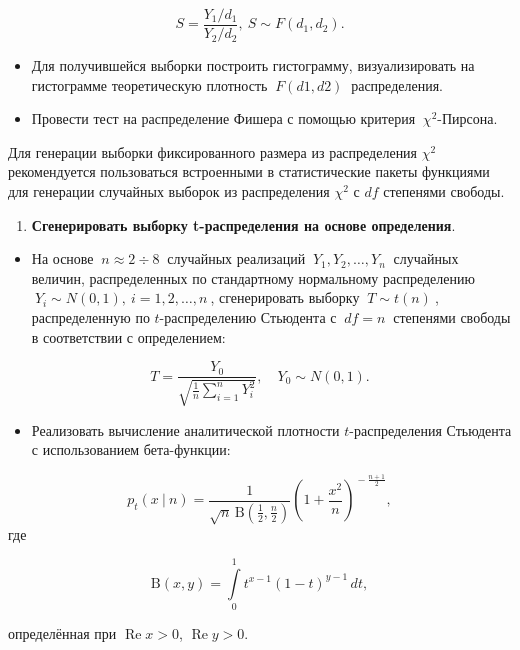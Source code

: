 \documentclass[
]{article}
\providecommand{\tightlist}{%
  \setlength{\itemsep}{0pt}\setlength{\parskip}{0pt}}
\begin{document}
\[
S = \frac{Y_1 / d_1}{Y_2 / d_2}, \ S\sim F(d_1, d_2).
\]

\begin{itemize}
\item
  Для получившейся выборки построить гистограмму, визуализировать на
  гистограмме теоретическую плотность \(\ F(d1, d2)\ \) распределения.
\item
  Провести тест на распределение Фишера с помощью критерия
  \(\ \chi^2\)-Пирсона.
\end{itemize}

Для генерации выборки фиксированного размера из распределения \(\chi^2\)
рекомендуется пользоваться встроенными в статистические пакеты функциями
для генерации случайных выборок из распределения \(\chi^2\) с \(df\)
степенями свободы.

\begin{enumerate}
\def\labelenumi{\arabic{enumi}.}
\setcounter{enumi}{3}
\tightlist
\item
  \textbf{Сгенерировать выборку t-распределения на основе определения}.
\end{enumerate}

\begin{itemize}
\tightlist
\item
  На основе \(\ n \approx 2\div 8\ \) случайных реализаций
  \(\ Y_1, Y_2, \dots, Y_n\ \) случайных величин, распределенных по
  стандартному нормальному распределению
  \(\ Y_i \sim N(0, 1), \ i = 1, 2, \dots, n\ \), сгенерировать выборку
  \(\ T \sim t(n)\ \), распределенную по \(t\)-распределению Стьюдента с
  \(\ df = n\ \) степенями свободы в соответствии с определением:
\end{itemize}

\[
T = \frac{Y_0}{\sqrt{\frac{1}{n} \sum_{i=1}^{n} Y_i^2}}, \quad Y_0 \sim N(0, 1).
\]

\begin{itemize}
\tightlist
\item
  Реализовать вычисление аналитической плотности \(t\)-распределения
  Стьюдента с использованием бета-функции:
\end{itemize}

\[
{\displaystyle p_{t}(x\ |\ n)={\frac {1}{{\sqrt {n}}\,\mathrm {B} ({\frac {1}{2}},{\frac {n}{2}})}}\left(1+{\frac {x^{2}}{n}}\right)^{\!-{\frac {n+1}{2}}}},
\] где

\[
{\displaystyle \mathrm {B} (x,y)=\int \limits _{0}^{1}t^{x-1}(1-t)^{y-1}\,dt,}
\]

определённая при \({\displaystyle \operatorname {Re} x>0}\),
\({\displaystyle \operatorname {Re} y>0}\).
\end{document}
